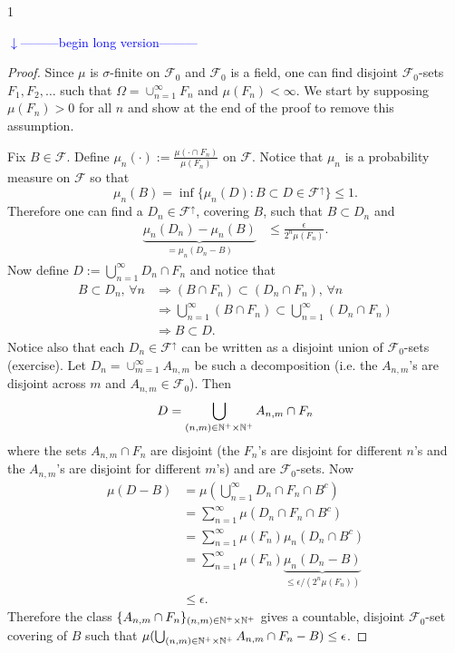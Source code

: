 \documentclass[10pt,letterpaper,twocolumn]{article}
\def\Ver{1}
\def\LongVer{1}
\begin{document}
\if\Ver\LongVer{ 
{\flushleft\textcolor{blue}{$\downarrow$---------begin long version---------}}\newline

\begin{proof} 

Since $\mu$ is $\sigma$-finite on $\mathcal F_0$ and $\mathcal F_0$ is a field, one can find disjoint $\mathcal F_0$-sets $F_1, F_2,\ldots$ such that $\Omega = \cup_{n=1}^\infty F_n$ and $\mu(F_n)<\infty$. We start by supposing $\mu(F_n)>0$ for all $n$ and show at the end of the proof to remove this assumption. 


Fix $B\in \mathcal F$.
Define  $ \mu_n(\cdot):= \frac{\mu(\cdot\cap F_n)}{\mu(F_n)} $ on $\mathcal F$. Notice that $\mu_n$ is a probability measure on $\mathcal F$ so that
\[ \mu_n(B)=\inf\{ \mu_n(D): B\subset D \in \mathcal F^{\uparrow}\}\leq 1. \]
Therefore one can find a $D_n\in \mathcal F^{\uparrow}$, covering $B$, such that
$B\subset D_n$ and
\begin{align}
\label{aaa}
\underbrace{\mu_n(D_n)-\mu_n(B)}_{=\mu_n(D_n - B)} &\leq \frac{\epsilon}{2^n \mu(F_n)}.
\end{align}
 Now define  $D :=\bigcup_{n=1}^\infty D_n\cap F_n$
and notice that 
\begin{align*}
 B\subset D_n, \,\forall n&\Rightarrow (B\cap F_n) \subset (D_n\cap F_n), \,\forall n \\
 &\Rightarrow \bigcup_{n=1}^\infty  (B\cap  F_n) \subset  \bigcup_{n=1}^\infty (D_n\cap F_n) \\
 &\Rightarrow B\subset D.
 \end{align*}
Notice also that each  $D_n\in\mathcal F^\uparrow$ can be written as a disjoint union of $\mathcal F_0$-sets (exercise). Let $D_n = \cup_{m=1}^\infty A_{n,m}$ be such a decomposition (i.e. the $A_{n,m}$'s are  disjoint across $m$ and $A_{n,m}\in\mathcal F_0$). Then 
\[D =  \bigcup_{(n,m)\in \Bbb N^+\times \Bbb N^+}  A_{n,m}\cap F_n\]
where the sets $A_{n,m}\cap F_n$ are disjoint (the $F_n$'s are disjoint for different $n$'s and  the $A_{n,m}$'s are disjoint for different $m$'s) and are $\mathcal F_0$-sets. Now
\begin{align}
\mu(D - B) &= \mu(\bigcup_{n=1}^\infty D_n\cap F_n \cap B^c)\nonumber\\
 &= \sum_{n=1}^\infty \mu(D_n\cap F_n \cap B^c)\nonumber\\
 &=  \sum_{n=1}^\infty \mu(F_n)\mu_n(D_n \cap B^c)\nonumber\\
  &=  \sum_{n=1}^\infty \mu(F_n)\underbrace{\mu_n(D_n - B)}_{\leq \epsilon/(2^n\mu(F_n))}\nonumber\\
 &\leq \epsilon.\label{if}
\end{align}
Therefore the class $\{ A_{n,m}\cap F_n\}_{(n,m)\in \Bbb N^+\times \Bbb N^+ }$ gives a countable, disjoint $\mathcal F_0$-set covering of $B$ such that $\mu(\bigcup_{(n,m)\in \Bbb N^+\times \Bbb N^+}  A_{n,m}\cap F_n - B )\leq \epsilon$. 


\end{proof}}
\end{document}
